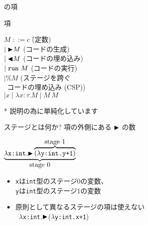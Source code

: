 \documentclass[dvipdfmx,aspectratio=169, 20pt]{beamer}
\newcommand{\xmark}{\ding{55}}%
\begin{document}
\begin{frame}[fragile]{\LMD の項}
    \begin{block}{項}
        \begin{tabbing}
            \hspace{5mm} \( M \) \= \( ::= c \) \hspace{20mm} \= (定数) \\
            \> \( \mid {\mathop{\blacktriangleright}} M \) \> (コードの生成) \\
            \> \( \mid {\mathop{\blacktriangleleft}} M \) \> (コードの埋め込み) \\
            \> \( \mid \verb|run|\ M \) \> (コードの実行) \\
            \> \( \mid \% M \) \> (ステージを跨ぐ \\
            \> \> \ コードの埋め込み (CSP)) \\
            \> \( \mid x \mid \lambda x:\tau.M \mid M\ M \)
        \end{tabbing}
    \end{block}
    * 説明の為に単純化しています
\end{frame}

\begin{frame}[fragile]{ステージとは何か?}
    項の外側にある \( {\mathop{\blacktriangleright}} \) の数
    \begin{exampleblock}{}
        \begin{center}
            \( \underbrace{\lambda \texttt{x:int}.\TB\overbrace{(\lambda \texttt{y:int.y+1})}^{\let\scriptstyle\textstyle\substack{\text{stage }1}}}_{\let\scriptstyle\textstyle\substack{\text{stage }0}} \)
        \end{center}
    \end{exampleblock}
    \begin{itemize}
        \item {\tt x}は{\tt int}型のステージ0の変数、\\{\tt y}は{\tt int}型のステージ1の変数
        \item 原則として異なるステージの項は使えない\\
            \xmark\ $\lambda$\texttt{x:int}.${\mathop{\blacktriangleright}}$($\lambda$\texttt{y:int.}{\tt x}\texttt{+1})
    \end{itemize}
\end{frame}
\end{document}
